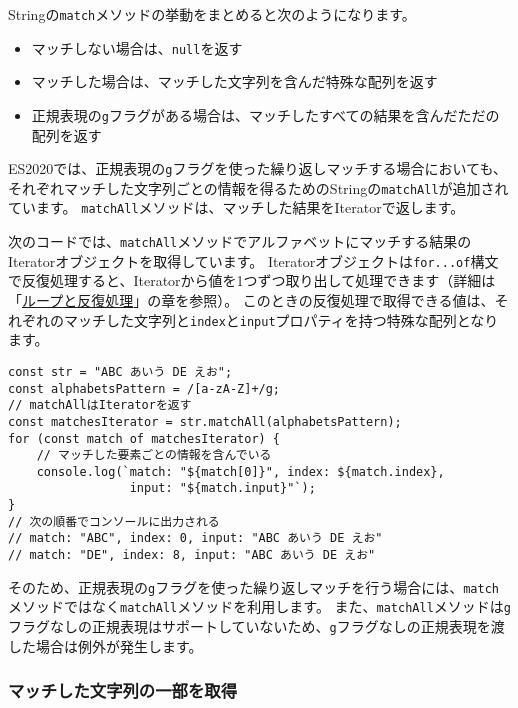 Stringの\texttt{match}メソッドの挙動をまとめると次のようになります。
\newpage
\begin{itemize}
\item 
  マッチしない場合は、\texttt{null}を返す
\item
  マッチした場合は、マッチした文字列を含んだ特殊な配列を返す
\item
  正規表現の\texttt{g}フラグがある場合は、マッチしたすべての結果を含んだただの配列を返す
\end{itemize}

ES2020では、正規表現の\texttt{g}フラグを使った繰り返しマッチする場合においても、それぞれマッチした文字列ごとの情報を得るためのStringの\texttt{matchAll}が追加されています。
\texttt{matchAll}メソッドは、マッチした結果をIteratorで返します。

次のコードでは、\texttt{matchAll}メソッドでアルファベットにマッチする結果のIteratorオブジェクトを取得しています。
Iteratorオブジェクトは\texttt{for...of}構文で反復処理すると、Iteratorから値を1つずつ取り出して処理できます（詳細は「\hyperlink{loop-and-iteration}{ループと反復処理}」の章を参照）。
このときの反復処理で取得できる値は、それぞれのマッチした文字列と\texttt{index}と\texttt{input}プロパティを持つ特殊な配列となります。

\begin{lstlisting}
const str = "ABC あいう DE えお";
const alphabetsPattern = /[a-zA-Z]+/g;
// matchAllはIteratorを返す
const matchesIterator = str.matchAll(alphabetsPattern);
for (const match of matchesIterator) {
    // マッチした要素ごとの情報を含んでいる
    console.log(`match: "${match[0]}", index: ${match.index},
                 input: "${match.input}"`);
}
// 次の順番でコンソールに出力される
// match: "ABC", index: 0, input: "ABC あいう DE えお"
// match: "DE", index: 8, input: "ABC あいう DE えお"
\end{lstlisting}

そのため、正規表現の\texttt{g}フラグを使った繰り返しマッチを行う場合には、\texttt{match}メソッドではなく\texttt{matchAll}メソッドを利用します。
また、\texttt{matchAll}メソッドは\texttt{g}フラグなしの正規表現はサポートしていないため、\texttt{g}フラグなしの正規表現を渡した場合は例外が発生します。

\hypertarget{match-capture-by-regexp}{%
\subsubsection{マッチした文字列の一部を取得}\label{match-capture-by-regexp}}

